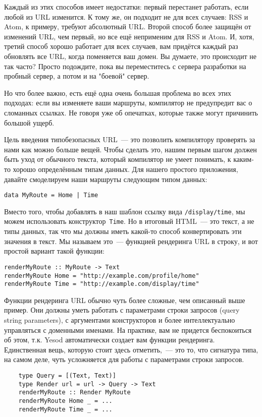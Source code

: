Каждый из этих способов имеет недостатки: первый перестанет работать, если
любой из URL изменится. К тому же, он подходит не для всех случаев: RSS и Atom,
к примеру, требуют абсолютный URL. Второй способ более защищён от изменений
URL, чем первый, но все ещё неприменим для RSS и Atom.  И, хотя, третий способ
хорошо работает для всех случаев, вам придётся каждый раз обновлять все URL,
когда поменяется ваш домен.  Вы думаете, это происходит не так часто? Просто
подождите, пока вы переместитесь с сервера разработки на пробный сервер, а
потом и на "боевой" сервер.

Но что более важно, есть ещё одна очень большая проблема во всех этих подходах:
если вы изменяете ваши маршруты, компилятор не предупредит вас о сломанных
ссылках. Не говоря уже об опечатках, которые также могут причинить большой
ущерб.

Цель введения типобезопасных URL~--- это позволить компилятору проверять за
нами как можно больше вещей. Чтобы сделать это, нашим первым шагом должен быть
уход от обычного текста, который компилятор не умеет понимать, к каким-то
хорошо определённым типам данных. Для нашего простого приложения, давайте
смоделируем наши маршруты следующим типом данных:

\begin{lstlisting}
data MyRoute = Home | Time
\end{lstlisting}

Вместо того, чтобы добавлять в наш шаблон ссылку вида \texttt{/display/time},
мы можем использовать конструктор~\lstinline'Time'. Но в итоговый HTML~--- это
текст, а не типы данных, так что мы должны иметь какой-то способ конвертировать
эти значения в текст.  Мы называем это~--- функцией рендеринга URL в строку,
и вот простой вариант такой функции:

\begin{lstlisting}
renderMyRoute :: MyRoute -> Text
renderMyRoute Home = "http://example.com/profile/home"
renderMyRoute Time = "http://example.com/display/time"
\end{lstlisting}

\begin{remark}
    Функции рендеринга URL обычно чуть более сложные, чем описанный выше
    пример.  Они должны уметь работать с параметрами строки запросов (query
    string parameters), с аргументами конструкторов и более интеллектуально
    управляться с доменными именами.  На практике, вам не придется беспокоиться
    об этом, т.к. Yesod автоматически создает вам функции рендеринга.
    Единственная вещь, которую стоит здесь отметить,~--- это то, что сигнатура
    типа, на самом деле, чуть усложняется для работы с параметрами строки
    запросов.

    \begin{lstlisting}
    type Query = [(Text, Text)]
    type Render url = url -> Query -> Text
    renderMyRoute :: Render MyRoute
    renderMyRoute Home _ = ...
    renderMyRoute Time _ = ...
    \end{lstlisting}
\end{remark}

